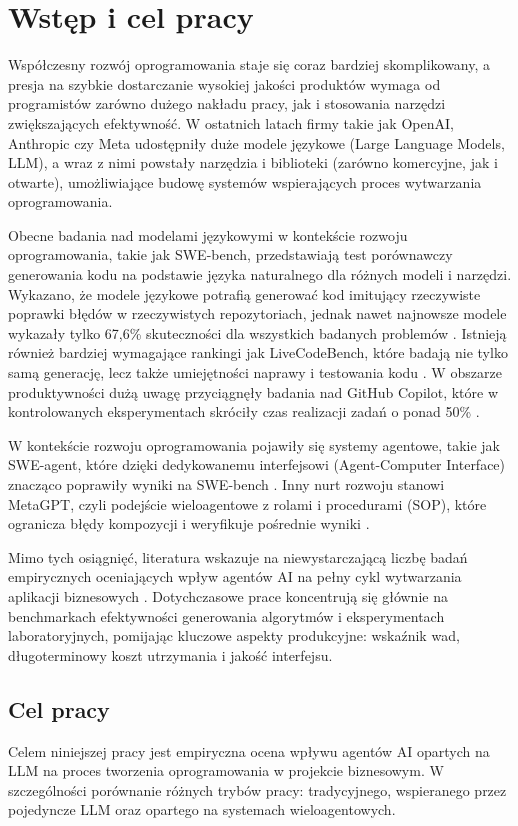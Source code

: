 \newpage
\section{Wstęp i cel pracy}
Współczesny rozwój oprogramowania staje się coraz bardziej skomplikowany, a presja na szybkie dostarczanie wysokiej jakości produktów wymaga od programistów zarówno dużego nakładu pracy, jak i stosowania narzędzi zwiększających efektywność. W ostatnich latach firmy takie jak OpenAI, Anthropic czy Meta udostępniły duże modele językowe (Large Language Models, LLM), a wraz z nimi powstały narzędzia i biblioteki (zarówno komercyjne, jak i otwarte), umożliwiające budowę systemów wspierających proces wytwarzania oprogramowania.

Obecne badania nad modelami językowymi w kontekście rozwoju oprogramowania, takie jak SWE-bench, przedstawiają test porównawczy generowania kodu na podstawie języka naturalnego dla różnych modeli i narzędzi. Wykazano, że modele językowe potrafią generować kod imitujący rzeczywiste poprawki błędów w rzeczywistych repozytoriach, jednak nawet najnowsze modele wykazały tylko 67,6\% skuteczności dla wszystkich badanych problemów \cite{jimenez2024swebenchlanguagemodelsresolve}. Istnieją również bardziej wymagające rankingi jak LiveCodeBench, które badają nie tylko samą generację, lecz także umiejętności naprawy i testowania kodu \cite{jain2024livecodebench}. W obszarze produktywności dużą uwagę przyciągnęły badania nad GitHub Copilot, które w kontrolowanych eksperymentach skróciły czas realizacji zadań o ponad 50\% \cite{peng2023impact}.

W kontekście rozwoju oprogramowania pojawiły się systemy agentowe, takie jak SWE-agent, które dzięki dedykowanemu interfejsowi (Agent-Computer Interface) znacząco poprawiły wyniki na SWE-bench \cite{yang2024sweagent}. Inny nurt rozwoju stanowi MetaGPT, czyli podejście wieloagentowe z rolami i procedurami (SOP), które ogranicza błędy kompozycji i weryfikuje pośrednie wyniki \cite{hong2023metagpt}.

Mimo tych osiągnięć, literatura wskazuje na niewystarczającą liczbę badań empirycznych oceniających wpływ agentów AI na pełny cykl wytwarzania aplikacji biznesowych \cite{cao2025buildbenchmarkrevisiting274}. Dotychczasowe prace koncentrują się głównie na benchmarkach efektywności generowania algorytmów i eksperymentach laboratoryjnych, pomijając kluczowe aspekty produkcyjne: wskaźnik wad, długoterminowy koszt utrzymania i jakość interfejsu.

\subsection{Cel pracy}
Celem niniejszej pracy jest empiryczna ocena wpływu agentów AI opartych na LLM na proces tworzenia oprogramowania w projekcie biznesowym. W szczególności porównanie różnych trybów pracy: tradycyjnego, wspieranego przez pojedyncze LLM oraz opartego na systemach wieloagentowych.

